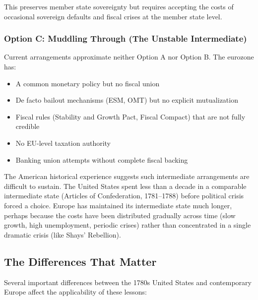 \documentclass[12pt]{article}
\begin{document}
This preserves member state sovereignty but requires accepting the costs of occasional sovereign defaults and fiscal crises at the member state level.

\subsubsection{Option C: Muddling Through (The Unstable Intermediate)}

Current arrangements approximate neither Option A nor Option B. The eurozone has:
\begin{itemize}
\item A common monetary policy but no fiscal union
\item De facto bailout mechanisms (ESM, OMT) but no explicit mutualization
\item Fiscal rules (Stability and Growth Pact, Fiscal Compact) that are not fully credible
\item No EU-level taxation authority
\item Banking union attempts without complete fiscal backing
\end{itemize}

The American historical experience suggests such intermediate arrangements are difficult to sustain. The United States spent less than a decade in a comparable intermediate state (Articles of Confederation, 1781--1788) before political crisis forced a choice. Europe has maintained its intermediate state much longer, perhaps because the costs have been distributed gradually across time (slow growth, high unemployment, periodic crises) rather than concentrated in a single dramatic crisis (like Shays' Rebellion).

\subsection{The Differences That Matter}

Several important differences between the 1780s United States and contemporary Europe affect the applicability of these lessons:
\end{document}
